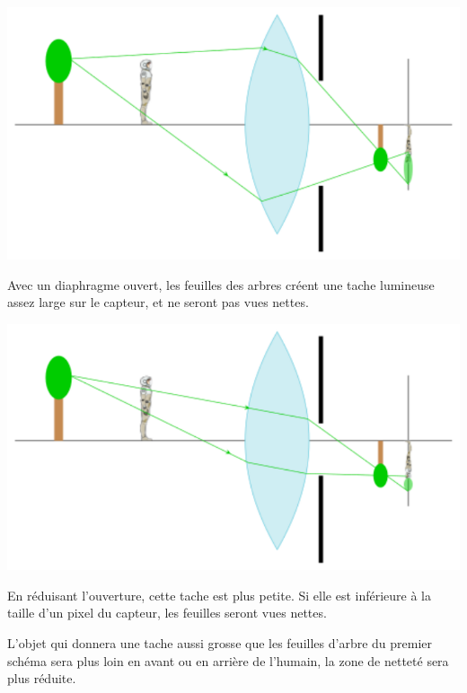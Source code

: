 \documentclass[../../main/main.tex]{subfiles}
\begin{document}
\begin{minipage}{0.47\linewidth}
	\begin{center}
		\includegraphics[width=\linewidth]{pfd_chp_ouverture-a}
	\end{center}
	Avec un diaphragme ouvert, les feuilles des arbres créent une tache
	lumineuse assez large sur le capteur, et ne seront pas vues nettes.
\end{minipage}
\hfill
\begin{minipage}{0.47\linewidth}
	\begin{center}
		\includegraphics[width=\linewidth]{pfd_chp_ouverture-b}
	\end{center}
	En réduisant l'ouverture, cette tache est plus petite. Si elle est
	inférieure à la taille d'un pixel du capteur, les feuilles
	seront vues nettes.
\end{minipage}

\medskip

L'objet qui donnera une tache aussi grosse que les feuilles d'arbre du premier
schéma sera plus loin en avant ou en arrière de l'humain, la zone de netteté
sera plus réduite.
\end{document}
